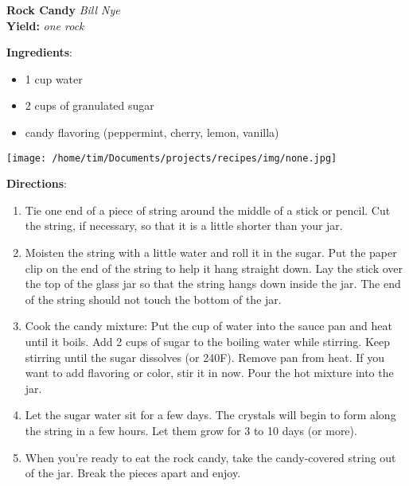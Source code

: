 \documentclass[11pt, twoside, openany]{book}
\begin{document}
\noindent\begin{minipage}[t]{\linewidth}%
{\Large\textbf{Rock Candy}} \label{rock-candy}\hfill\textit{Bill Nye}\\
\textbf{Yield:} \textit{one rock}\\
\noindent\begin{minipage}[t]{0.78\linewidth}%
\textbf{Ingredients}:\vspace{-3mm}
\begin{multicols}{2}
\begin{itemize}\setlength\itemsep{-1mm}
\item 1 cup water
\item 2 cups of granulated sugar
\item candy flavoring (peppermint, cherry, lemon, vanilla)
\end{itemize}
\end{multicols}
\end{minipage}
\noindent\begin{minipage}[t]{0.18\linewidth}
\centering \strut\vspace*{-\baselineskip}\newline
\texttt{[image: /home/tim/Documents/projects/recipes/img/none.jpg]}\\
\end{minipage}\vspace{3mm}
\textbf{Directions}:
\vspace{-3mm}\begin{enumerate}\setlength\itemsep{-1mm}
\item Tie one end of a piece of string around the middle of a stick or pencil. Cut the string, if necessary, so that it is a little shorter than your jar. 
\item Moisten the string with a little water and roll it in the sugar. Put the paper clip on the end of the string to help it hang straight down. Lay the stick over the top of the glass jar so that the string hangs down inside the jar. The end of the string should not touch the bottom of the jar. 
\item Cook the candy mixture: Put the cup of water into the sauce pan and heat until it boils. Add 2 cups of sugar to the boiling water while stirring. Keep stirring until the sugar dissolves (or 240F). Remove pan from heat. If you want to add flavoring or color, stir it in now. Pour the hot mixture into the jar. 
\item Let the sugar water sit for a few days. The crystals will begin to form along the string in a few hours. Let them grow for 3 to 10 days (or more).
\item When you're ready to eat the rock candy, take the candy-covered string out of the jar. Break the pieces apart and enjoy.
\end{enumerate}
\end{minipage}\vspace{8mm}
\end{document}
